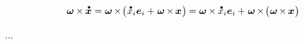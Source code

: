 \begin{otherlanguage}{russian}
\begin{equation*}
\bm{\omega} \hspace{-0.12ex} \times \hspace{-0.12ex} \mathdotabove{\bm{x}}
= \bm{\omega} \hspace{-0.2ex} \times \hspace{-0.33ex} \bigl( \hspace{.1ex} \mathdotabove{x}_i \bm{e}_i + \hspace{.1ex} \bm{\omega} \hspace{-0.2ex} \times \hspace{-0.2ex} \bm{x} \hspace{.1ex} \bigr) \hspace{-0.15ex}
= \hspace{-0.2ex} \tikzmark{beginCoriolisHalf} \hspace{.2ex} \bm{\omega} \hspace{-0.1ex} \times \hspace{-0.1ex} \mathdotabove{x}_i \bm{e}_i \hspace{.2ex} \tikzmark{endCoriolisHalf} \hspace{-0.25ex}
+ \hspace{.1ex} \bm{\omega} \hspace{-0.2ex} \times \hspace{-0.33ex} \bigl( \hspace{.1ex} \bm{\omega} \hspace{-0.2ex} \times \hspace{-0.2ex} \bm{x} \hspace{.1ex} \bigr)
\end{equation*}%

...


\end{otherlanguage}




